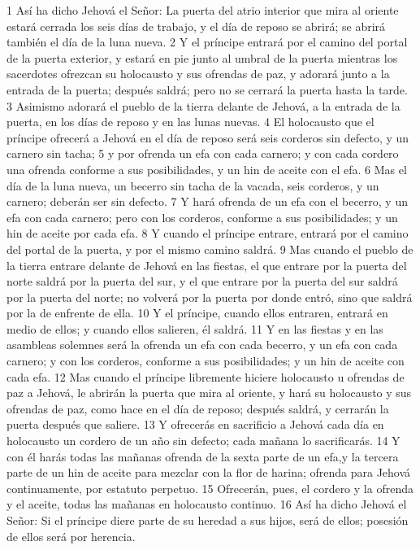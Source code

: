 1 Así ha dicho Jehová el Señor: La puerta del atrio interior que mira al oriente estará cerrada los seis días de trabajo, y el día de reposo se abrirá; se abrirá también el día de la luna nueva.
2 Y el príncipe entrará por el camino del portal de la puerta exterior, y estará en pie junto al umbral de la puerta mientras los sacerdotes ofrezcan su holocausto y sus ofrendas de paz, y adorará junto a la entrada de la puerta; después saldrá; pero no se cerrará la puerta hasta la tarde.
3 Asimismo adorará el pueblo de la tierra delante de Jehová, a la entrada de la puerta, en los días de reposo y en las lunas nuevas.
4 El holocausto que el príncipe ofrecerá a Jehová en el día de reposo será seis corderos sin defecto, y un carnero sin tacha;
5 y por ofrenda un efa con cada carnero; y con cada cordero una ofrenda conforme a sus posibilidades, y un hin de aceite con el efa.
6 Mas el día de la luna nueva, un becerro sin tacha de la vacada, seis corderos, y un carnero; deberán ser sin defecto.
7 Y hará ofrenda de un efa con el becerro, y un efa con cada carnero; pero con los corderos, conforme a sus posibilidades; y un hin de aceite por cada efa.
8 Y cuando el príncipe entrare, entrará por el camino del portal de la puerta, y por el mismo camino saldrá.
9 Mas cuando el pueblo de la tierra entrare delante de Jehová en las fiestas, el que entrare por la puerta del norte saldrá por la puerta del sur, y el que entrare por la puerta del sur saldrá por la puerta del norte; no volverá por la puerta por donde entró, sino que saldrá por la de enfrente de ella.
10 Y el príncipe, cuando ellos entraren, entrará en medio de ellos; y cuando ellos salieren, él saldrá.
11 Y en las fiestas y en las asambleas solemnes será la ofrenda un efa con cada becerro, y un efa con cada carnero; y con los corderos, conforme a sus posibilidades; y un hin de aceite con cada efa.
12 Mas cuando el príncipe libremente hiciere holocausto u ofrendas de paz a Jehová, le abrirán la puerta que mira al oriente, y hará su holocausto y sus ofrendas de paz, como hace en el día de reposo; después saldrá, y cerrarán la puerta después que saliere.
13 Y ofrecerás en sacrificio a Jehová cada día en holocausto un cordero de un año sin defecto; cada mañana lo sacrificarás.
14 Y con él harás todas las mañanas ofrenda de la sexta parte de un efa,y la tercera parte de un hin de aceite para mezclar con la flor de harina; ofrenda para Jehová continuamente, por estatuto perpetuo.
15 Ofrecerán, pues, el cordero y la ofrenda y el aceite, todas las mañanas en holocausto continuo.
16 Así ha dicho Jehová el Señor: Si el príncipe diere parte de su heredad a sus hijos, será de ellos; posesión de ellos será por herencia.
